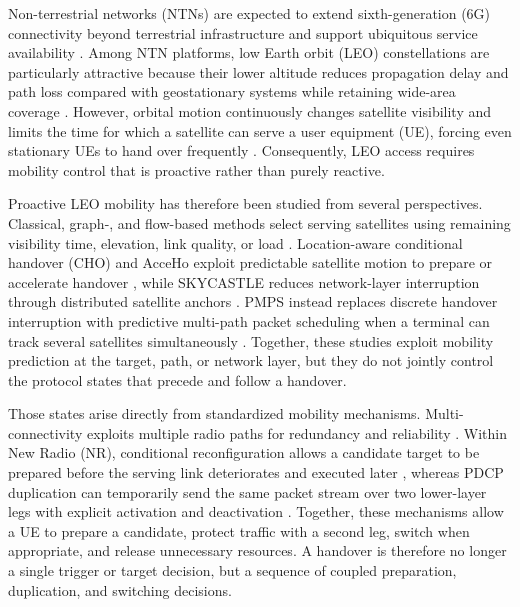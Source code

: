 \documentclass[journal]{IEEEtran}
\begin{document}
Non-terrestrial networks (NTNs) are expected to extend sixth-generation (6G)
connectivity beyond terrestrial infrastructure and support ubiquitous service
availability \cite{giordani2021ntn,3gpp38811,fontanesi2026aisurvey}. Among NTN
platforms, low Earth orbit (LEO) constellations are particularly attractive
because their lower altitude reduces propagation delay and path loss compared
with geostationary systems while retaining wide-area coverage
\cite{giordani2021ntn,juan2022handover}. However, orbital motion continuously
changes satellite visibility and limits the time for which a satellite can
serve a user equipment (UE), forcing even stationary UEs to hand over
frequently \cite{ji2021mobility,juan2022handover}. Consequently, LEO access
requires mobility control that is proactive rather than purely reactive.

Proactive LEO mobility has therefore been studied from several perspectives.
Classical, graph-, and flow-based methods select serving satellites using
remaining visibility time, elevation, link quality, or load
\cite{zhang2021networkflow,juan2022handover}. Location-aware conditional
handover (CHO) and AcceHo exploit predictable satellite motion to prepare or
accelerate handover \cite{lee2023locationcho,wu2024acceho}, while SKYCASTLE
reduces network-layer interruption through distributed satellite anchors
\cite{li2024skycastle}. PMPS instead replaces discrete handover interruption
with predictive multi-path packet scheduling when a terminal can track several
satellites simultaneously \cite{wang2026pmps}. Together, these studies exploit
mobility prediction at the target, path, or network layer, but they do not
jointly control the protocol states that precede and follow a handover.

Those states arise directly from standardized mobility mechanisms.
Multi-connectivity exploits multiple radio paths for redundancy and reliability
\cite{pupiales2021mc,lopez2022empiricalmc,3gpp38821}. Within New Radio (NR),
conditional reconfiguration allows a candidate target to be prepared before
the serving link deteriorates and executed later \cite{3gpp38331}, whereas
PDCP duplication can temporarily send the same packet stream over two
lower-layer legs with explicit activation and deactivation \cite{3gpp38323}.
Together, these mechanisms allow a UE to prepare a candidate, protect traffic
with a second leg, switch when appropriate, and release unnecessary resources.
A handover is therefore no longer a single trigger or target decision, but a
sequence of coupled preparation, duplication, and switching decisions.
\end{document}
